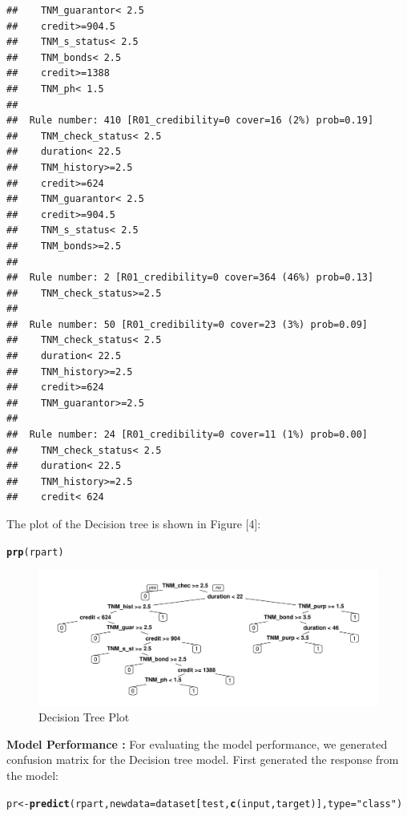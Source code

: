 \documentclass{article}\usepackage[]{graphicx}\usepackage[]{color}
\makeatletter
\def\maxwidth{ %
  \ifdim\Gin@nat@width>\linewidth
    \linewidth
  \else
    \Gin@nat@width
  \fi
}
\newcommand{\hlstr}[1]{\textcolor[rgb]{0.192,0.494,0.8}{#1}}%
\newcommand{\hlstd}[1]{\textcolor[rgb]{0.345,0.345,0.345}{#1}}%
\newcommand{\hlkwb}[1]{\textcolor[rgb]{0.69,0.353,0.396}{#1}}%
\newcommand{\hlkwc}[1]{\textcolor[rgb]{0.333,0.667,0.333}{#1}}%
\newcommand{\hlkwd}[1]{\textcolor[rgb]{0.737,0.353,0.396}{\textbf{#1}}}%
\newenvironment{kframe}{%
 \def\at@end@of@kframe{}%
 \ifinner\ifhmode%
  \def\at@end@of@kframe{\end{minipage}}%
  \begin{minipage}{\columnwidth}%
 \fi\fi%
 \def\FrameCommand##1{\hskip\@totalleftmargin \hskip-\fboxsep
 \colorbox{shadecolor}{##1}\hskip-\fboxsep
     \hskip-\linewidth \hskip-\@totalleftmargin \hskip\columnwidth}%
 \MakeFramed {\advance\hsize-\width
   \@totalleftmargin\z@ \linewidth\hsize
   \@setminipage}}%
 {\par\unskip\endMakeFramed%
 \at@end@of@kframe}
\newenvironment{knitrout}{}{} %
\makeatother
\begin{document}
\begin{knitrout}
\begin{kframe}
\begin{verbatim}
##    TNM_guarantor< 2.5
##    credit>=904.5
##    TNM_s_status< 2.5
##    TNM_bonds< 2.5
##    credit>=1388
##    TNM_ph< 1.5
## 
##  Rule number: 410 [R01_credibility=0 cover=16 (2%) prob=0.19]
##    TNM_check_status< 2.5
##    duration< 22.5
##    TNM_history>=2.5
##    credit>=624
##    TNM_guarantor< 2.5
##    credit>=904.5
##    TNM_s_status< 2.5
##    TNM_bonds>=2.5
## 
##  Rule number: 2 [R01_credibility=0 cover=364 (46%) prob=0.13]
##    TNM_check_status>=2.5
## 
##  Rule number: 50 [R01_credibility=0 cover=23 (3%) prob=0.09]
##    TNM_check_status< 2.5
##    duration< 22.5
##    TNM_history>=2.5
##    credit>=624
##    TNM_guarantor>=2.5
## 
##  Rule number: 24 [R01_credibility=0 cover=11 (1%) prob=0.00]
##    TNM_check_status< 2.5
##    duration< 22.5
##    TNM_history>=2.5
##    credit< 624
\end{verbatim}
\end{kframe}
\end{knitrout}
The plot of the Decision tree is shown in Figure [4]:
\begin{knitrout}
\color{fgcolor}\begin{kframe}
\begin{alltt}
\hlkwd{prp}\hlstd{(rpart)}
\end{alltt}
\end{kframe}\begin{figure}
\includegraphics[width=\maxwidth]{figure/unnamed-chunk-36-1} \caption[Decision Tree Plot]{Decision Tree Plot}\label{fig:unnamed-chunk-36}
\end{figure}


\end{knitrout}
\textbf{Model Performance :} For evaluating the model performance, we generated confusion matrix for the Decision tree model. First generated the response from the model:
\begin{knitrout}
\color{fgcolor}\begin{kframe}
\begin{alltt}
\hlstd{pr} \hlkwb{<-} \hlkwd{predict}\hlstd{(rpart,} \hlkwc{newdata}\hlstd{=dataset[test,} \hlkwd{c}\hlstd{(input, target)],} \hlkwc{type}\hlstd{=}\hlstr{"class"}\hlstd{)}
\end{alltt}
\end{kframe}
\end{knitrout}
\end{document}
